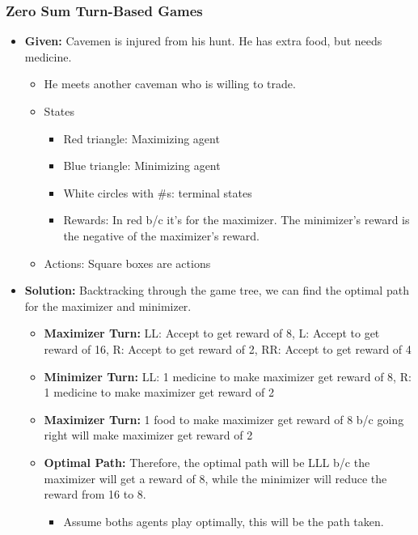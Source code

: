 \subsubsection{Zero Sum Turn-Based Games}
\begin{example}
    \begin{itemize}
        \item \textbf{Given:} Cavemen is injured from his hunt. He has extra food, but needs medicine.
        \begin{itemize}
            \item He meets another caveman who is willing to trade. 
        \end{itemize} 
        \vspace{-1.5em}
        \vspace{-1.5em}
        \begin{itemize}
            \item States
            \begin{itemize}
                \item Red triangle: Maximizing agent
                \item Blue triangle: Minimizing agent
                \item White circles with \#s: terminal states
                \item Rewards: In red b/c it's for the maximizer. The minimizer's reward is the negative of the maximizer's reward.
            \end{itemize}
            \item Actions: Square boxes are actions
        \end{itemize}
        \item \textbf{Solution:} Backtracking through the game tree, we can find the optimal path for the maximizer and minimizer.
        \begin{itemize}
            \item \textbf{Maximizer Turn:} LL: Accept to get reward of 8, L: Accept to get reward of 16, R: Accept to get reward of 2, RR: Accept to get reward of 4
            \item \textbf{Minimizer Turn:} LL: 1 medicine to make maximizer get reward of 8, R: 1 medicine to make maximizer get reward of 2
            \item \textbf{Maximizer Turn:} 1 food to make maximizer get reward of 8 b/c going right will make maximizer get reward of 2
            \item \textbf{Optimal Path:} Therefore, the optimal path will be LLL b/c the maximizer will get a reward of 8, while the minimizer will reduce the reward from 16 to 8.
            \begin{itemize}
                \item Assume boths agents play optimally, this will be the path taken. 
            \end{itemize}
        \end{itemize}
    \end{itemize}
\end{example}
